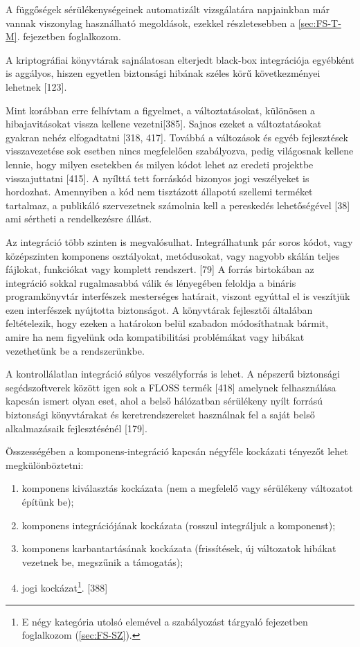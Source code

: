 \documentclass[12pt,magyar,a4paper,oneside]{scrreprt}
\providecommand{\tightlist}{%
  \setlength{\itemsep}{0pt}\setlength{\parskip}{0pt}}
\begin{document}
A függőségek sérülékenységeinek automatizált vizsgálatára napjainkban
már vannak viszonylag használható megoldások, ezekkel részletesebben a
\ref{sec:FS-T-M}. fejezetben foglalkozom.

A kriptográfiai könyvtárak sajnálatosan elterjedt black-box integrációja
egyébként is aggályos, hiszen egyetlen biztonsági hibának széles körű
következményei lehetnek {[}123{]}.

Mint korábban erre felhívtam a figyelmet, a változtatásokat, különösen a
hibajavitásokat vissza kellene vezetni{[}385{]}. Sajnos ezeket a
változtatásokat gyakran nehéz elfogadtatni {[}318, 417{]}. Továbbá a
változások és egyéb fejlesztések visszavezetése sok esetben nincs
megfelelően szabályozva, pedig világosnak kellene lennie, hogy milyen
esetekben és milyen kódot lehet az eredeti projektbe visszajuttatni
{[}415{]}. A nyílttá tett forráskód bizonyos jogi veszélyeket is
hordozhat. Amennyiben a kód nem tisztázott állapotú szellemi terméket
tartalmaz, a publikáló szervezetnek számolnia kell a pereskedés
lehetőségével {[}38{]} ami sértheti a rendelkezésre állást.

Az integráció több szinten is megvalósulhat. Integrálhatunk pár soros
kódot, vagy középszinten komponens osztályokat, metódusokat, vagy
nagyobb skálán teljes fájlokat, funkciókat vagy komplett rendszert.
{[}79{]} A forrás birtokában az integráció sokkal rugalmasabbá válik és
lényegében feloldja a bináris programkönyvtár interfészek mesterséges
határait, viszont egyúttal el is veszítjük ezen interfészek nyújtotta
biztonságot. A könyvtárak fejlesztői általában feltételezik, hogy ezeken
a határokon belül szabadon módosíthatnak bármit, amire ha nem figyelünk
oda kompatibilitási problémákat vagy hibákat vezethetünk be a
rendszerünkbe.

A kontrollálatlan integráció súlyos veszélyforrás is lehet. A népszerű
biztonsági segédszoftverek között igen sok a FLOSS termék {[}418{]}
amelynek felhasználása kapcsán ismert olyan eset, ahol a belső
hálózatban sérülékeny nyílt forrású biztonsági könyvtárakat és
keretrendszereket használnak fel a saját belső alkalmazásaik
fejlesztésénél {[}179{]}.

Összességében a komponens-integráció kapcsán négyféle kockázati tényezőt
lehet megkülönböztetni:

\begin{enumerate}
\def\labelenumi{\arabic{enumi}.}
\tightlist
\item
  komponens kiválasztás kockázata (nem a megfelelő vagy sérülékeny
  változatot építünk be);
\item
  komponens integrációjának kockázata (rosszul integráljuk a
  komponenst);
\item
  komponens karbantartásának kockázata (frissítések, új változatok
  hibákat vezetnek be, megszűnik a támogatás);
\item
  jogi kockázat\footnote{E négy kategória utolsó elemével a szabályozást
    tárgyaló fejezetben foglalkozom (\ref{sec:FS-SZ}).}. {[}388{]}
\end{enumerate}
\end{document}

